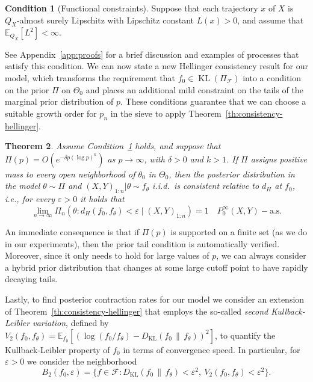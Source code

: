\documentclass{article}
\numberwithin{equation}{section}
\theoremstyle{plain}
\newtheorem{theorem}{Theorem}
\theoremstyle{definition}
\newtheorem{condition}[theorem]{Condition}
\renewcommand{\epsilon}{\varepsilon}
\newcommand{\E}{\mathbb{E}}
\DeclareMathOperator{\KL} {KL}
\begin{document}
\begin{condition}[Functional constraints]\label{cond:condition-schwartz-X}
  Suppose that each trajectory \(x\) of \(X\) is \(Q_X\)-almost surely Lipschitz with Lipschitz constant \(L(x)>0\), and assume that \(\mathbb E_{Q_X}[L^2]<\infty\).
\end{condition}

See Appendix~\ref{app:proofs} for a brief discussion and examples of processes that satisfy this condition. We can now state a new Hellinger consistency result for our model, which transforms the requirement that \(f_0\in \KL(\Pi_\mathcal F)\) into a condition on the prior \(\Pi\) on \(\Theta_0\) and places an additional mild constraint on the tails of the marginal prior distribution of \(p\). These conditions guarantee that we can choose a suitable growth order for \(p_n\) in the sieve to apply Theorem~\ref{th:consistency-hellinger}.

\begin{theorem}\label{th:consistency-schwartz-linear}
  Assume Condition~\ref{cond:condition-schwartz-X} holds, and suppose that \(\Pi(p)=O(e^{-\delta p (\log p)^k})\) as \(p\to\infty\), with \(\delta > 0\) and \(k>1\). If \(\Pi\) assigns positive mass to every open neighborhood of \(\theta_0\) in \(\Theta_0\), then the posterior distribution in the model \(\theta \sim \Pi\) and \((X,Y)_{1:n}|\theta \sim f_\theta\) i.i.d.\ is consistent relative to \(d_H\) at \(f_0\), i.e., for every \(\epsilon>0\) it holds that
  \[
    \lim_{n\to\infty} \Pi_n(\theta: d_H(f_0, f_\theta) < \epsilon \mid (X,Y)_{1:n})=1\quad P_0^\infty(X,Y)-\text{a.s.}
  \]
\end{theorem}

An immediate consequence is that if \(\Pi(p)\) is supported on a finite set (as we do in our experiments), then the prior tail condition is automatically verified. Moreover, since it only needs to hold for large values of \(p\), we can always consider a hybrid prior distribution that changes at some large cutoff point to have rapidly decaying tails.

Lastly, to find posterior contraction rates for our model we consider an extension of Theorem~\ref{th:consistency-hellinger} that employs the so-called \textit{second Kullback-Leibler variation}, defined by \(V_2(f_0, f_\theta)=\E_{f_0}[(\log(f_0/f_\theta) - D_{\mathrm{KL}}(f_0 \,\|\, f_\theta))^2]\), to quantify the Kullback-Leibler property of \(f_0\) in terms of convergence speed. In particular, for \(\epsilon>0\) we consider the neighborhood
\[
B_2(f_0, \epsilon) = \{f\in \mathcal F: D_{\mathrm{KL}}(f_0 \,\|\, f_\theta) < \epsilon^2,\  V_2(f_0, f_\theta) < \epsilon^2\}.
\]
\end{document}
